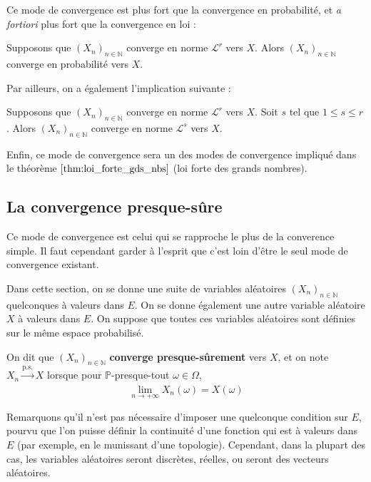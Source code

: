 \documentclass[../integ-proba.tex]{subfiles}
\begin{document}
Ce mode de convergence est plus fort que la convergence en probabilité, et \textit{a fortiori} plus fort que la convergence en loi :

\begin{prop}
    Supposons que $\left(X_n\right)_{n\in\mathbb{N}}$ converge en norme $\mathcal{L}^r$ vers $X$.
    Alors $\left(X_n\right)_{n\in\mathbb{N}}$ converge en probabilité vers $X$.
\end{prop}

Par ailleurs, on a également l'implication suivante :

\begin{prop}
    Supposons que $\left(X_n\right)_{n\in\mathbb{N}}$ converge en norme $\mathcal{L}^r$ vers $X$.
    Soit $s$ tel que $1 \leq s \leq r$.
    Alors $\left(X_n\right)_{n\in\mathbb{N}}$ converge en norme $\mathcal{L}^s$ vers $X$.
\end{prop}

\begin{rem}
    Enfin, ce mode de convergence sera un des modes de convergence impliqué dans le théorème $\ref{thm:loi_forte_gds_nbs}$ (loi forte des grands nombres).
\end{rem}

\subsection{La convergence presque-sûre}

Ce mode de convergence est celui qui se rapproche le plus de la converence simple.
Il faut cependant garder à l'esprit que c'est loin d'être le seul mode de convergence existant.

Dans cette section, on se donne une suite de variables aléatoires $\left(X_n\right)_{n\in\mathbb{N}}$ quelconques à valeurs dans $E$.
On se donne également une autre variable aléatoire $X$ à valeurs dans $E$.
On suppose que toutes ces variables aléatoires sont définies sur le même espace probabilisé.

\begin{defi}
    On dit que $\left(X_n\right)_{n\in\mathbb{N}}$ \textbf{converge presque-sûrement} vers $X$, et on note $X_n \xrightarrow[]{\text{p.s.}} X$ lorsque pour $\mathbb{P}$-presque-tout $\omega \in \Omega$,
    $$
    \lim_{n \to +\infty} X_n(\omega) = X(\omega)
    $$
\end{defi}

\begin{rem}
    Remarquons qu'il n'est pas nécessaire d'imposer une quelconque condition sur $E$, pourvu que l'on puisse définir la continuité d'une fonction qui est à valeurs dans $E$ (par exemple, en le munissant d'une topologie).
    Cependant, dans la plupart des cas, les variables aléatoires seront discrètes, réelles, ou seront des vecteurs aléatoires.
\end{rem}
\end{document}
